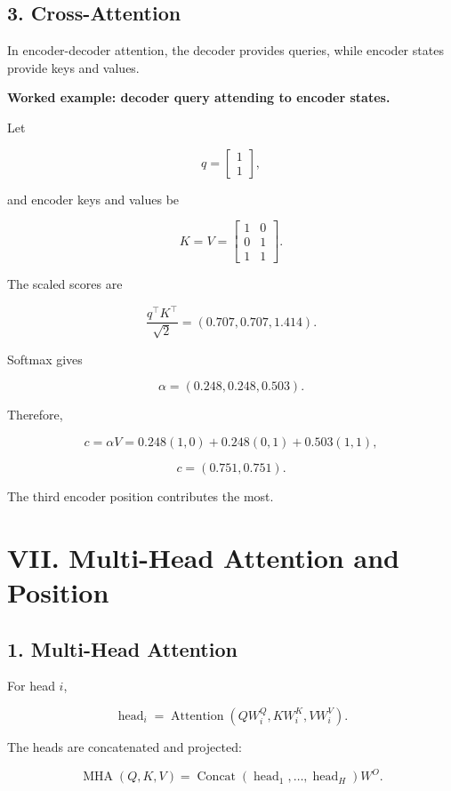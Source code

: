 \documentclass[11pt,a4paper,twoside]{article}
\begin{document}
\subsection*{3. Cross-Attention}

In encoder-decoder attention, the decoder provides queries, while encoder states provide keys and values.

\textbf{Worked example: decoder query attending to encoder states.}

Let

\[
q=\begin{bmatrix}1\\1\end{bmatrix},
\]

and encoder keys and values be

\[
K=V=
\begin{bmatrix}
1&0\\
0&1\\
1&1
\end{bmatrix}.
\]

The scaled scores are

\[
\frac{q^\top K^\top}{\sqrt2}
=(0.707,0.707,1.414).
\]

Softmax gives

\[
\alpha=(0.248,0.248,0.503).
\]

Therefore,

\[
c=\alpha V
=0.248(1,0)+0.248(0,1)+0.503(1,1),
\]

\[
\boxed{c=(0.751,0.751).}
\]

The third encoder position contributes the most.

\section*{VII. Multi-Head Attention and Position}

\subsection*{1. Multi-Head Attention}

For head $i$,

\[
\operatorname{head}_i
=\operatorname{Attention}(QW_i^Q,KW_i^K,VW_i^V).
\]

The heads are concatenated and projected:

\[
\boxed{
\operatorname{MHA}(Q,K,V)
=\operatorname{Concat}(\operatorname{head}_1,\ldots,\operatorname{head}_H)W^O
}.
\]
\end{document}
